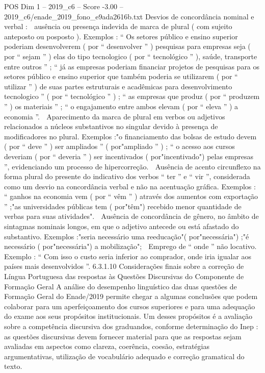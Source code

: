 \begin{textsample}{POS Dim 1 – 2019\_c6 – Score -3.00 – 2019\_c6/enade\_2019\_fono\_e9ada2616b.txt}
Desvios de concordância nominal e verbal :  ausência ou presença indevida de marca de plural ( com sujeito anteposto ou posposto ).
Exemplos : “ Os setores público e ensino superior poderiam desenvolverem ( por “ desenvolver ” ) pesquisas para empresas seja ( por “ sejam ” ) elas do tipo tecnologico ( por “ tecnológico ” ), saúde, transporte entre outros ” ; “ já as empresas poderiam financiar projetos de pesquisas para os setores público e ensino superior que também poderia se utilizarem ( por “ utilizar ” ) de suas partes estruturais e acadêmicas para desenvolvimento tecnologico ” ( por “ tecnológico ” ) ; “ as empresas que produz ( por “ produzem ” ) os materiais ” ; “ o engajamento entre ambos elevam ( por “ eleva ” ) a economia ”.  Aparecimento da marca de plural em verbos ou adjetivos relacionados a núcleos substantivos no singular devido à presença de modificadores no plural.
Exemplos :"o financiamento das bolsas de estudo devem ( por “ deve ” ) ser ampliados ” ( por"ampliado ” ) ; “ o acesso aos cursos deveriam ( por “ deveria ” ) ser incentivados ( por"incentivado") pelas empresas ”, evidenciando um processo de hipercorreção.  Ausência de acento circunflexo na forma plural do presente do indicativo dos verbos “ ter ” e “ vir ”, considerada como um desvio na concordância verbal e não na acentuação gráfica.
Exemplos : “ ganhos na economia vem ( por “ vêm ” ) através dos aumentos com exportação ” ;"as universidades públicas tem ( por"têm") recebido menor quantidade de verbas para suas atividades".  Ausência de concordância de gênero, no âmbito de sintagmas nominais longos, em que o adjetivo antecede ou está afastado do substantivo.
Exemplos :"seria necessário uma reeducação"( por"necessária") ;"é necessário ( por"necessária") a mobilização";  Emprego de “ onde ” não locativo.
Exemplo : “ Com isso o custo seria inferior ao comprador, onde iria igualar aos países mais desenvolvidos ”. 6.3.1.10 Considerações finais sobre a correção de Língua Portuguesa das respostas às Questões Discursivas do Componente de Formação Geral A análise do desempenho linguístico das duas questões de Formação Geral do Enade/2019 permite chegar a algumas conclusões que podem colaborar para um aperfeiçoamento dos cursos superiores e para uma adequação do exame aos seus propósitos institucionais.
Um desses propósitos é a avaliação sobre a competência discursiva dos graduandos, conforme determinação do Inep : as questões discursivas devem fornecer material para que as respostas sejam avaliadas em aspectos como clareza, coerência, coesão, estratégias argumentativas, utilização de vocabulário adequado e correção gramatical do texto.

\end{textsample}
